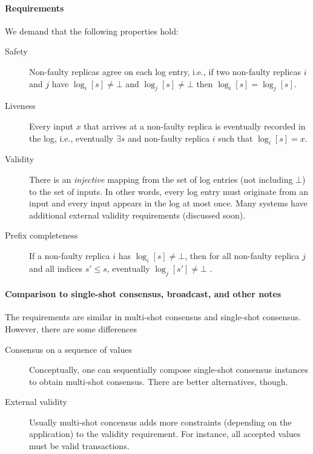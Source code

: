 \paragraph{Requirements}
We demand that the following properties hold:
\begin{description}
    \item[Safety] Non-faulty replicas agree on 
    each log entry, i.e., if two non-faulty replicas $i$ and $j$ have 
    $\log_i[s] \ne\bot$ and $\log_j[s]\ne\bot$ then $\log_i[s] = \log_j[s]$.

    \item[Liveness] Every input $x$ that arrives at 
    a non-faulty replica is eventually recorded in the log,
     i.e., eventually $\exists s$ and non-faulty replica $i$ such that $\log_i[s]=x$.

    \item[Validity] There is an \emph{injective} mapping from the set of 
    log entries (not including $\bot$) to the set of inputs.
    In other words, every log entry must originate from an input and 
    every input appears in the log at most once. 
    Many systems have additional external validity requirements (discussed soon).

    \item[Prefix completeness]
    If a non-faulty replica $i$ has $\log_i[s] \ne\bot$,
    then for all non-faulty replica $j$ and all indices $s'\le s$,
    eventually $\log_j[s'] \ne\bot$ .

\end{description}


\paragraph{Comparison to single-shot consensus, broadcast, and other notes}
The requirements are similar in multi-shot consensus and 
single-shot consensus. However, there are some differences
\begin{description}
    \item[Consensus on a sequence of values] Conceptually, one can sequentially
    compose single-shot consensus instances to obtain multi-shot consensus.
    There are better alternatives, though.

    \item[External validity] Usually multi-shot concensus adds more constraints 
    (depending on the application) to the validity requirement. 
    For instance, all accepted values must be valid transactions.
\end{description}


